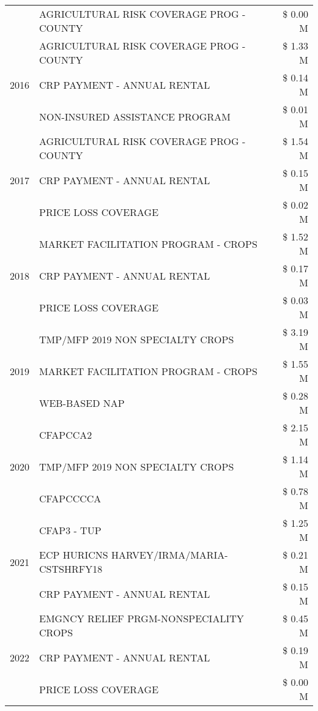 \begin{tabular}{llr}
 & AGRICULTURAL RISK COVERAGE PROG - COUNTY & \$ 0.00 M \\
\cline{1-3}
\multirow[t]{3}{*}{2016} & AGRICULTURAL RISK COVERAGE PROG - COUNTY & \$ 1.33 M \\
 & CRP PAYMENT - ANNUAL RENTAL & \$ 0.14 M \\
 & NON-INSURED ASSISTANCE PROGRAM & \$ 0.01 M \\
\cline{1-3}
\multirow[t]{3}{*}{2017} & AGRICULTURAL RISK COVERAGE PROG - COUNTY & \$ 1.54 M \\
 & CRP PAYMENT - ANNUAL RENTAL & \$ 0.15 M \\
 & PRICE LOSS COVERAGE & \$ 0.02 M \\
\cline{1-3}
\multirow[t]{3}{*}{2018} & MARKET FACILITATION PROGRAM - CROPS & \$ 1.52 M \\
 & CRP PAYMENT - ANNUAL RENTAL & \$ 0.17 M \\
 & PRICE LOSS COVERAGE & \$ 0.03 M \\
\cline{1-3}
\multirow[t]{3}{*}{2019} & TMP/MFP 2019 NON SPECIALTY CROPS & \$ 3.19 M \\
 & MARKET FACILITATION PROGRAM - CROPS & \$ 1.55 M \\
 & WEB-BASED NAP & \$ 0.28 M \\
\cline{1-3}
\multirow[t]{3}{*}{2020} & CFAPCCA2 & \$ 2.15 M \\
 & TMP/MFP 2019 NON SPECIALTY CROPS & \$ 1.14 M \\
 & CFAPCCCCA & \$ 0.78 M \\
\cline{1-3}
\multirow[t]{3}{*}{2021} & CFAP3 - TUP & \$ 1.25 M \\
 & ECP HURICNS HARVEY/IRMA/MARIA-CSTSHRFY18 & \$ 0.21 M \\
 & CRP PAYMENT - ANNUAL RENTAL & \$ 0.15 M \\
\cline{1-3}
\multirow[t]{3}{*}{2022} & EMGNCY RELIEF PRGM-NONSPECIALITY CROPS & \$ 0.45 M \\
 & CRP PAYMENT - ANNUAL RENTAL & \$ 0.19 M \\
 & PRICE LOSS COVERAGE & \$ 0.00 M \\
\cline{1-3}
\bottomrule
\end{tabular}
